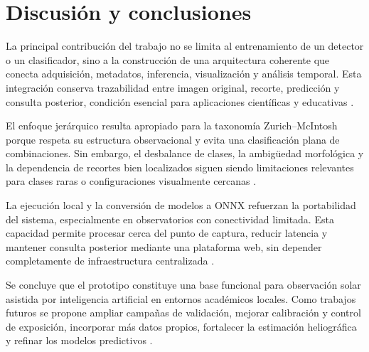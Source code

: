 \section{Discusión y conclusiones}

La principal contribución del trabajo no se limita al entrenamiento de un detector o un clasificador, sino a la construcción de una arquitectura coherente que conecta adquisición, metadatos, inferencia, visualización y análisis temporal. Esta integración conserva trazabilidad entre imagen original, recorte, predicción y consulta posterior, condición esencial para aplicaciones científicas y educativas \citep{scherrer2012hmi,noaaSRS,camporeale2019ml}.

El enfoque jerárquico resulta apropiado para la taxonomía Zurich--McIntosh porque respeta su estructura observacional y evita una clasificación plana de combinaciones. Sin embargo, el desbalance de clases, la ambigüedad morfológica y la dependencia de recortes bien localizados siguen siendo limitaciones relevantes para clases raras o configuraciones visualmente cercanas \citep{mcintosh1990classification,bornmann1994flarerates,cui2019classbalanced}.

La ejecución local y la conversión de modelos a ONNX refuerzan la portabilidad del sistema, especialmente en observatorios con conectividad limitada. Esta capacidad permite procesar cerca del punto de captura, reducir latencia y mantener consulta posterior mediante una plataforma web, sin depender completamente de infraestructura centralizada \citep{ultralyticsYOLO26,woo2023convnextv2,raspberryPi5Docs2026}.

Se concluye que el prototipo constituye una base funcional para observación solar asistida por inteligencia artificial en entornos académicos locales. Como trabajos futuros se propone ampliar campañas de validación, mejorar calibración y control de exposición, incorporar más datos propios, fortalecer la estimación heliográfica y refinar los modelos predictivos \citep{cesarHeliographic,podladchikova2012kalman,schmid2010dmd}.